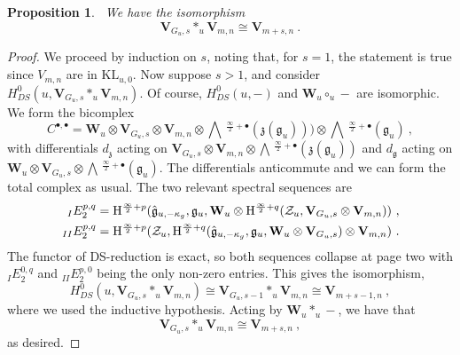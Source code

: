 \documentclass[a4paper]{article}
\newtheorem{prop}[thm]{Proposition}
\def\ZZ{{\cal Z}}
\def\gf{\mathfrak{g}}
\def \zf{\mathfrak{z}}
\def \KL{\mathrm{KL}}
\newcommand{\Hi}[1]{\mathrm{H}^{\frac{\infty}{2}+#1}}
\newcommand{\Li}[1]{\mathrm{\bigwedge}\,^{\frac{\infty}{2}+#1}}
\def\W{\mathbf{W}}
\def\V{\mathbf{V}}
\begin{document}
\begin{prop}~\label{prop:ff-untwisted-mixed}
We have the isomorphism
\begin{equation*}
	\V_{G_u,s}\ast_u \V_{m,n} \cong \V_{m+s,n}~.
\end{equation*}
\end{prop}
\begin{proof}
We proceed by induction on $s$, noting that, for $s=1$, the statement is true since $V_{m,n}$ are in $\KL_{u,0}$. Now suppose $s>1$, and consider $H^0_{DS}(u,\V_{G_u,s}\ast_u \V_{m,n})$. Of course, $H^0_{DS}(u,-)$ and $\W_u\circ_u -$ are isomorphic. We form the bicomplex
\begin{equation*}
	C^{\bullet, \bullet} = \W_{u}\otimes \V_{G_u,s} \otimes \V_{m,n}\otimes \Li{\bullet}(\zf(\gf_u)))\otimes \Li{\bullet}(\gf_u)~,
\end{equation*}
with differentials $d_\zf$ acting on $\V_{G_u,s} \otimes \V_{m,n}\otimes \Li{\bullet}(\zf(\gf_u))$ and $d_{\gf}$ acting on $\W_u\otimes\V_{G_u,s}\otimes \Li{\bullet}(\gf_u)$. The differentials anticommute and we can form the total complex as usual. The two relevant spectral sequences are
\begin{equation}\nonumber
	\begin{split}
	_{I} E_{2}^{p,q} = \Hi{p}(\hat{\gf}_{u,-\kappa_g},\gf_u, \W_u \otimes \Hi{q}(\ZZ_u,\V_{G_u,s}\otimes \V_{m,n}))~,\\
	_{II} E_{2}^{p,q} = \Hi{p}(\ZZ_u,\Hi{q}(\hat{\gf}_{u,-\kappa_g},\gf_u, \W_u\otimes \V_{G_u,s})\otimes \V_{m,n})~.
	\end{split}
\end{equation}
The functor of DS-reduction is exact, so both sequences collapse at page two with $_{I} E_{2}^{0,q}$ and $_{II}E_{2}^{p,0}$ being the only non-zero entries. This gives the isomorphism,
\begin{equation*}
H^0_{DS}(u,\V_{G_u,s}\ast_u\V_{m,n}) \cong \V_{G_u,s-1}\ast_u\V_{m,n} \cong \V_{m+s-1,n}~,
\end{equation*}
where we used the inductive hypothesis. Acting by $\W_u\ast_u-$, we have that
\begin{equation}
	\V_{G_u,s} \ast_u \V_{m,n} \cong \V_{m+s,n}~,
\end{equation}
as desired.
\end{proof}
\vspace{-6pt}
\end{document}
